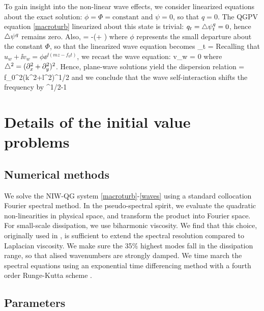 \documentclass{jfm}
\begin{document}
To gain insight into the
non-linear wave effects, we consider linearized equations about the exact solution:
$\phi = \Phi = \text{constant}$ and $\psi = 0$, so that $q=0$. The QGPV
equation \eqref{macroturb} linearized about this state is trivial: $q_t =
\triangle\psi^q_t = 0$, hence $\triangle\psi^q$ remains zero. Also,
\beq
\label{lin_q}
\lap\psiw = -\lap\half(\phi + \phis)\com
\eeq
where $\phi$ represents the small departure about the constant $\Phi$, so that
the linearized wave equation becomes
\beq
\phi_t =  \per
\eeq
Recalling that $u_w + \ii v_w = \phi \ee^{\ii (mz -f_0 t)}$, we recast the wave
equation:
\beq
{} v_w = 0\com
\eeq
where $\triangle^2 = (\partial_x^2 + \partial_y^2)^2$. Hence, plane-wave solutions yield the
dispersion relation
\beq
\omega = \half f_0\lambda^2(k^2+l^2)^{1/2}\com
\eeq
and we conclude that the wave self-interaction shifts the frequency by
\beq
{}^{1/2}-1\per
\eeq


\section{Details of the initial value problems}

\subsection{Numerical methods}
We solve the NIW-QG system \eqref{macroturb}-\eqref{waves} using a standard
collocation Fourier spectral method.
In the pseudo-spectral spirit, we evaluate  the quadratic non-linearities in
physical space, and transform the product into Fourier space. For small-scale
dissipation, we use biharmonic viscosity. We find that this choice, originally
used in \cite{mcwilliams1984}, is sufficient
to extend the spectral resolution compared to Laplacian viscosity.
We make sure the 35$\%$ highest modes fall in the dissipation range, so that alised
wavenumbers are strongly damped. We time march the spectral equations
using an exponential time differencing method with a fourth order Runge-Kutta scheme
\citep[details in][]{kassam_trefethen2005}.

\subsection{Parameters}
\end{document}
